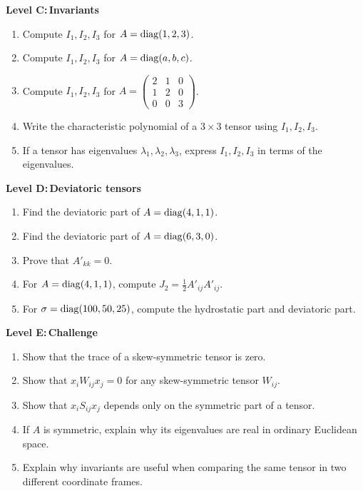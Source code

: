\documentclass{otscience}
\begin{document}
\begin{practicebox}
    \textbf{Level C:\,Invariants}
    \begin{enumerate}
        \item Compute \(I_1,I_2,I_3\) for \(A=\operatorname{diag}(1,2,3)\).
        \item Compute \(I_1,I_2,I_3\) for \(A=\operatorname{diag}(a,b,c)\).
        \item Compute \(I_1,I_2,I_3\) for \(A=\begin{pmatrix}2&1&0\\1&2&0\\0&0&3\end{pmatrix}\).
        \item Write the characteristic polynomial of a \(3\times3\) tensor using \(I_1,I_2,I_3\).
        \item If a tensor has eigenvalues \(\lambda_1,\lambda_2,\lambda_3\), express \(I_1,I_2,I_3\) in terms of the eigenvalues.
    \end{enumerate}

    \textbf{Level D:\,Deviatoric tensors}
    \begin{enumerate}
        \item Find the deviatoric part of \(A=\operatorname{diag}(4,1,1)\).
        \item Find the deviatoric part of \(A=\operatorname{diag}(6,3,0)\).
        \item Prove that \(A'_{kk}=0\).
        \item For \(A=\operatorname{diag}(4,1,1)\), compute \(J_2=\frac12A'_{ij}A'_{ij}\).
        \item For \(\sigma=\operatorname{diag}(100,50,25)\), compute the hydrostatic part and deviatoric part.
    \end{enumerate}

    \textbf{Level E:\,Challenge}
    \begin{enumerate}
        \item Show that the trace of a skew-symmetric tensor is zero.
        \item Show that \(x_{i}W_{ij}x_j=0\) for any skew-symmetric tensor \(W_{ij}\).
        \item Show that \(x_{i}S_{ij}x_j\) depends only on the symmetric part of a tensor.
        \item If \(A\) is symmetric, explain why its eigenvalues are real in ordinary Euclidean space.
        \item Explain why invariants are useful when comparing the same tensor in two different coordinate frames.
    \end{enumerate}
\end{practicebox}

\ifdefined\OTCOMBINED%
\else
\end{document}
